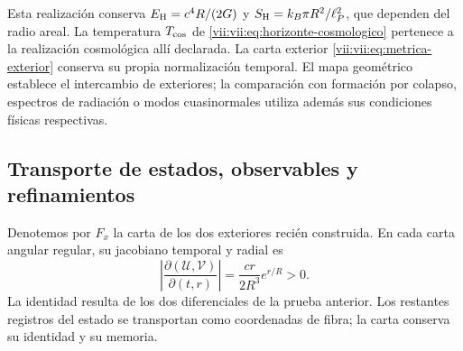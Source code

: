 Esta realización conserva
\(E_{\rm H}=c^4R/(2G)\) y
\(S_{\rm H}=k_B\pi R^2/\ell_P^2\), que dependen del radio areal.
La temperatura \(T_{\rm cos}\) de
\eqref{vii:vii:eq:horizonte-cosmologico} pertenece a la realización
cosmológica allí declarada. La carta exterior
\eqref{vii:vii:eq:metrica-exterior} conserva su propia normalización temporal.
El mapa geométrico establece el intercambio de exteriores; la comparación
con formación por colapso, espectros de radiación o modos cuasinormales
utiliza además sus condiciones físicas respectivas.

\subsection{Transporte de estados, observables y refinamientos}
\label{vii:vii:subsec:transporte-informacion-horizonte}

Denotemos por \(F_x\) la carta de los dos exteriores recién construida.
En cada carta angular regular, su jacobiano temporal y radial es
\begin{equation}
 \left|\frac{\partial(\mathcal U,\mathcal V)}{\partial(t,r)}\right|
 =\frac{cr}{2R^3}e^{r/R}>0.
 \label{vii:vii:eq:jacobiano-kruskal}
\end{equation}
La identidad resulta de los dos diferenciales de la prueba anterior.
Los restantes registros del estado se transportan como coordenadas de
fibra; la carta conserva su identidad y su memoria.

